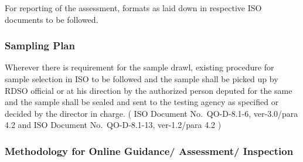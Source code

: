 \documentclass[
]{article}
\begin{document}
For reporting of the assessment, formats as laid down in respective ISO
documents to be followed.

\hypertarget{sampling-plan}{%
\subsubsection{Sampling Plan}\label{sampling-plan}}

Wherever there is requirement for the sample drawl, existing procedure
for sample selection in ISO to be followed and the sample shall be
picked up by RDSO official or at his direction by the authorized person
deputed for the same and the sample shall be sealed and sent to the
testing agency as specified or decided by the director in charge. ( ISO
Document No.~QO-D-8.1-6, ver-3.0/para 4.2 and ISO Document
No.~QO-D-8.1-13, ver-1.2/para 4.2 )

\hypertarget{methodology-for-online-guidance-assessment-inspection}{%
\subsubsection{Methodology for Online Guidance/ Assessment/
Inspection}\label{methodology-for-online-guidance-assessment-inspection}}
\end{document}
